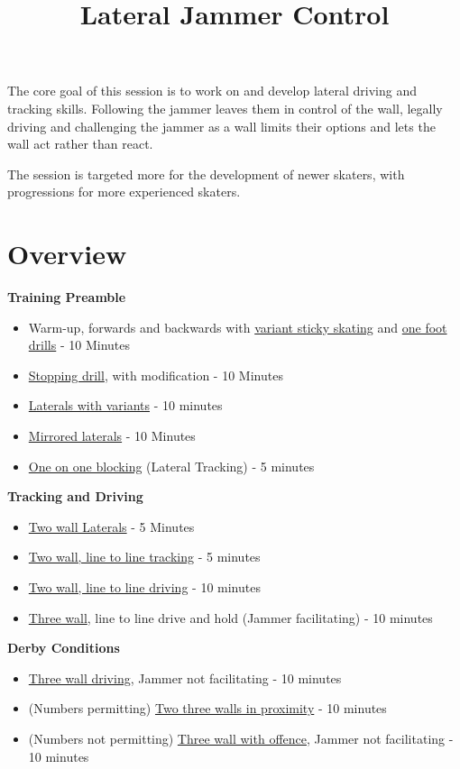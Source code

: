 \documentclass{journal}
\title{Lateral Jammer Control}
\author{}
\begin{document}
\maketitle
\noindent 

The core goal of this session is to work on and develop lateral driving and tracking skills. Following the jammer leaves them in control of the wall, legally driving and challenging the jammer as a wall limits their options and lets the wall act rather than react.        

The session is targeted more for the development of newer skaters, with progressions for more experienced skaters.        

\section*{Overview}

{\bf Training Preamble}
\begin{itemize}
\item Warm-up, forwards and backwards with \hyperref[drill:sticky:sticky_one_foot]{variant sticky skating} and \hyperref[drill:one_foot:serpentine]{one foot drills} - 10 Minutes
\item \hyperref[drill:stopping:jackie_daniels]{Stopping drill}, with modification - 10 Minutes 
\item \hyperref[drill:laterals]{Laterals with variants} - 10 minutes 
\item \hyperref[drill:laterals:mirrored]{Mirrored laterals} - 10 Minutes 
\item \hyperref[drill:blocking:one_on_one]{One on one blocking} (Lateral Tracking) - 5 minutes
\end{itemize}

\vspace{1cm}
\noindent 
{\bf Tracking and Driving}
\begin{itemize}
\item \hyperref[drill:two_wall:laterals]{Two wall Laterals} - 5 Minutes 
\item \hyperref[drill:two_wall:tracking]{Two wall, line to line tracking} - 5 minutes 
\item \hyperref[drill:two_wall:driving]{Two wall, line to line driving} - 10 minutes 
\item \hyperref[drill:three_wall:driving_facilitated]{Three wall}, line to line drive and hold (Jammer facilitating) - 10 minutes 
\end{itemize}

\vspace{1cm}
\noindent
{\bf Derby Conditions}
\begin{itemize}
\item \hyperref[drill:three_wall:driving]{Three wall driving}, Jammer not facilitating - 10 minutes 
\item (Numbers permitting) \hyperref[drill:three_wall:proximity]{Two three walls in proximity} - 10 minutes  
\item (Numbers not permitting) \hyperref[drill:three_wall:offence]{Three wall with offence}, Jammer not facilitating - 10 minutes 
\end{itemize}
\end{document}
